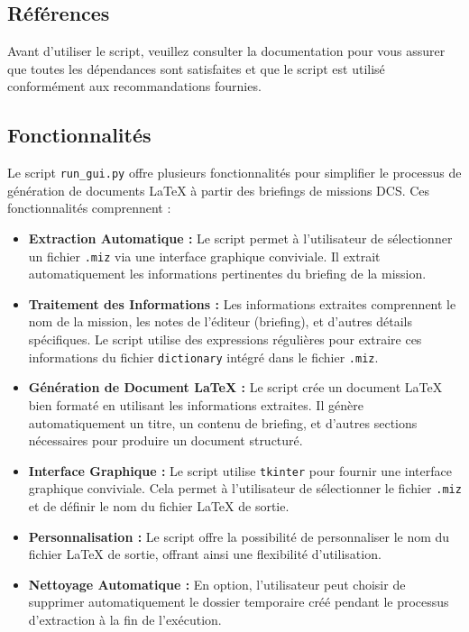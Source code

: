 \documentclass{article}
\begin{document}
\subsection{Références}
Avant d'utiliser le script, veuillez consulter la documentation pour vous assurer que toutes les dépendances sont satisfaites et que le script est utilisé conformément aux recommandations fournies.

\subsection{Fonctionnalités}

Le script \texttt{run\_gui.py} offre plusieurs fonctionnalités pour simplifier le processus de génération de documents LaTeX à partir des briefings de missions DCS. Ces fonctionnalités comprennent :

\begin{itemize}
    \item \textbf{Extraction Automatique :} Le script permet à l'utilisateur de sélectionner un fichier \texttt{.miz} via une interface graphique conviviale. Il extrait automatiquement les informations pertinentes du briefing de la mission.

    \item \textbf{Traitement des Informations :} Les informations extraites comprennent le nom de la mission, les notes de l'éditeur (briefing), et d'autres détails spécifiques. Le script utilise des expressions régulières pour extraire ces informations du fichier \texttt{dictionary} intégré dans le fichier \texttt{.miz}.

    \item \textbf{Génération de Document LaTeX :} Le script crée un document LaTeX bien formaté en utilisant les informations extraites. Il génère automatiquement un titre, un contenu de briefing, et d'autres sections nécessaires pour produire un document structuré.

    \item \textbf{Interface Graphique :} Le script utilise \texttt{tkinter} pour fournir une interface graphique conviviale. Cela permet à l'utilisateur de sélectionner le fichier \texttt{.miz} et de définir le nom du fichier LaTeX de sortie.

    \item \textbf{Personnalisation :} Le script offre la possibilité de personnaliser le nom du fichier LaTeX de sortie, offrant ainsi une flexibilité d'utilisation.

    \item \textbf{Nettoyage Automatique :} En option, l'utilisateur peut choisir de supprimer automatiquement le dossier temporaire créé pendant le processus d'extraction à la fin de l'exécution.
\end{itemize}
\end{document}
